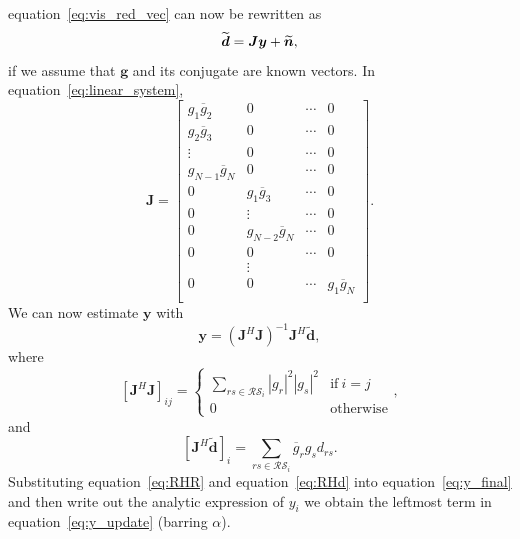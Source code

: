 \documentclass[useAMS,usenatbib]{mn2e}
\newcommand{\bn}{\bmath{n}}
\newcommand{\conj}[1]{\overline{#1}}
\begin{document}
equation~\ref{eq:vis_red_vec} can now be rewritten as 
\begin{equation}
\label{eq:linear_system}
\widetilde{\boldsymbol{d}} = \boldsymbol{J}\boldsymbol{y} + \widetilde{\bn}, 
\end{equation}
if we assume that $\boldsymbol{g}$ and its conjugate are known vectors. In equation~\ref{eq:linear_system},
\begin{equation}
\boldsymbol{J} = 
\begin{bmatrix}
g_1\conj{g}_2 & 0 & \cdots & 0\\
g_2\conj{g}_3 & 0 & \cdots & 0\\
\vdots & 0 & \cdots & 0\\
g_{N-1}\conj{g}_N & 0 & \cdots & 0\\
0 & g_1\conj{g}_3 & \cdots & 0\\
0 & \vdots & \cdots & 0\\
0 & g_{N-2}\conj{g}_N & \cdots & 0\\
0 & 0 & \cdots & 0\\
  & \vdots & \\
0 & 0 & \cdots & g_1\conj{g}_N\\  
\end{bmatrix}.
\end{equation}
We can now estimate $\boldsymbol{y}$ with
\begin{equation}
\label{eq:y_final}
\boldsymbol{y} = (\boldsymbol{J}^H\boldsymbol{J})^{-1}\boldsymbol{J}^H\widetilde{\boldsymbol{d}}, 
\end{equation}
where 
\begin{equation}
\label{eq:RHR}
[\boldsymbol{J}^H\boldsymbol{J}]_{ij} = 
\begin{cases}
\sum_{rs\in\mathcal{RS}_i} |g_r|^2|g_s|^2 &\textrm{if}~i=j\\
0&\textrm{otherwise}
\end{cases},
\end{equation}
and
\begin{equation}
\label{eq:RHd}
[\boldsymbol{J}^H\widetilde{\boldsymbol{d}}]_i = \sum_{rs\in\mathcal{RS}_i} \conj{g}_r g_s d_{rs}. 
\end{equation}
Substituting equation~\ref{eq:RHR} and equation~\ref{eq:RHd} into equation~\ref{eq:y_final} and then write out the analytic expression of $y_i$ we obtain
the leftmost term in equation~\ref{eq:y_update} (barring $\alpha$).



\label{lastpage}
\end{document}
